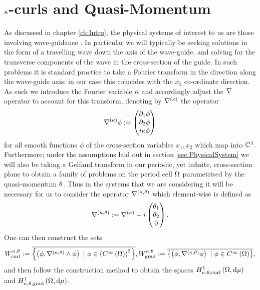 \section{$\kappa$-curls and Quasi-Momentum} \label{sec:kCurlsAndQM}
As discussed in chapter \ref{ch:Intro}, the physical systems of interest to us are those involving wave-guidance .
In particular we will typically be seeking solutions in the form of a travelling wave down the axis of the wave-guide, and solving for the transverse components of the wave in the cross-section of the guide.
In such problems it is standard practice to take a Fourier transform in the direction along the wave-guide axis; in our case this coincides with the $x_3$ co-ordinate direction.
As such we introduce the Fourier variable $\kappa$ and accordingly adjust the $\nabla$ operator to account for this transform, denoting by $\nabla^{(\kappa)}$ the operator
\begin{align*}
	\nabla^{(\kappa)}\phi := \begin{pmatrix} \partial_1\phi \\ \partial_2\phi \\ i\kappa\phi\end{pmatrix}
\end{align*}
for all smooth functions $\phi$ of the cross-section variables $x_1,x_2$ which map into $\mathbb{C}^3$.
Furthermore; under the assumptions laid out in section \ref{sec:PhysicalSystem}  we will also be taking a Gelfand transform in our periodic, yet infinite, cross-section plane to obtain a family of problems on the period cell $\Omega$ parametrised by the quasi-momentum $\theta$.
Thus in the systems that we are considering it will be necessary for us to consider the operator $\nabla^{\left( \kappa, \theta \right)}$ which element-wise is defined as
\begin{align*}
	\nabla^{\left( \kappa, \theta \right)} := \nabla^{(\kappa)} + i\begin{pmatrix} \theta_1 \\ \theta_2 \\ 0 \end{pmatrix}.
\end{align*}
One can then construct the sets
\begin{align*}
	W^{\kappa, \theta}_{\mathrm{curl}} := \overline{ \left\{  \left( \phi, \nabla_{}^{\left( \kappa, \theta \right)}\wedge\phi \right) \ \vert \ \phi\in\left( C^{\infty}\left( \Omega \right) \right)^3  \right\} },
	W^{\kappa, \theta}_{\mathrm{grad}} := \overline{ \left\{  \left( \phi, \nabla^{\left( \kappa, \theta \right)}\phi \right) \ \vert \ \phi\in C^{\infty}\left( \Omega \right)  \right\} },
\end{align*}
and then follow the construction method to obtain the spaces $H^1_{\kappa,\theta,\mathrm{curl}}\left( \Omega, \mathrm{d}\mu \right)$ and $H^1_{\kappa,\theta,\mathrm{grad}}\left( \Omega, \mathrm{d}\mu \right)$.
